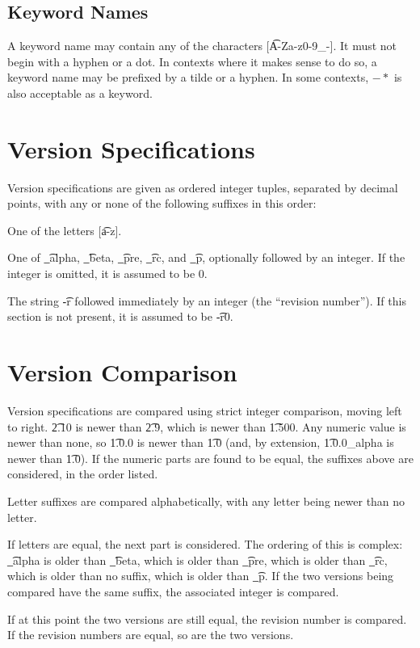 \subsection{Keyword Names}
\label{keyword-names}
A keyword name may contain any of the characters [\t{A-Za-z0-9\_-}]. It must not begin with a
hyphen or a dot. In contexts where it makes sense to do so, a keyword name may be prefixed by
a tilde or a hyphen. In some contexts, $-*$ is also acceptable as a keyword.

\section{Version Specifications}
Version specifications are given as ordered integer tuples, separated by decimal points, with any or
none of the following suffixes in this order:
\begin{bulletlist}
\item One of the letters [\t{a-z}].
\item One of \t{\_alpha}, \t{\_beta}, \t{\_pre}, \t{\_rc}, and \t{\_p}, optionally followed by an
    integer. If the integer is omitted, it is assumed to be 0.
\item The string \t{-r} followed immediately by an integer (the ``revision number''). If this section
    is not present, it is assumed to be \t{-r0}.
\end{bulletlist}

\section{Version Comparison}

Version specifications are compared using strict integer comparison, moving left to right. \t{2.10}
is newer than \t{2.9}, which is newer than \t{1.500}. Any numeric value is newer than none, so
\t{1.0.0} is newer than \t{1.0} (and, by extension, \t{1.0.0\_alpha} is newer than \t{1.0}).
If the numeric parts are found to be equal, the suffixes above are considered, in the order listed.

Letter suffixes are compared alphabetically, with any letter being newer than no letter.

If letters are equal, the next part is considered. The ordering of this is complex: \t{\_alpha} is
older than \t{\_beta}, which is older than \t{\_pre}, which is older than \t{\_rc}, which is older
than no suffix, which is older than \t{\_p}. If the two versions being compared have the same
suffix, the associated integer is compared.

If at this point the two versions are still equal, the revision number is compared. If the revision
numbers are equal, so are the two versions.

